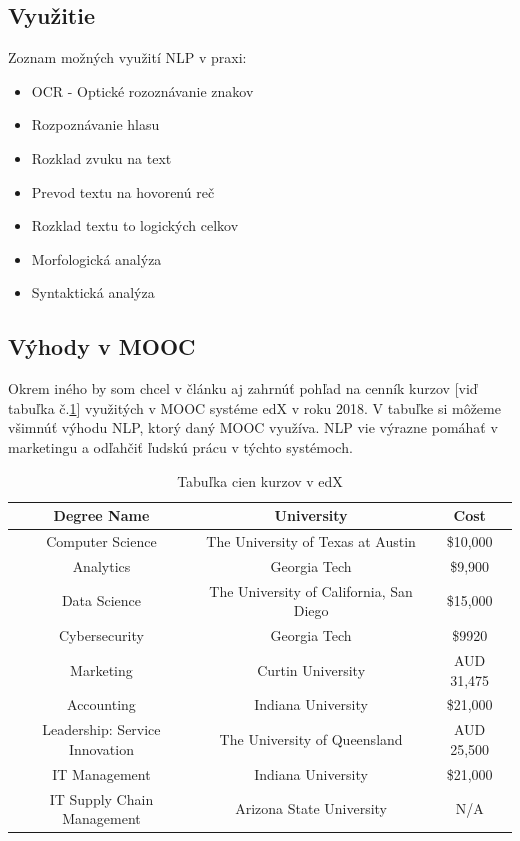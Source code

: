 \documentclass[10pt,slovak,a4paper,twoside]{article}
\begin{document}
\subsection{Využitie}
Zoznam možných využití NLP v praxi\cite{vyuzitieNLP}:
\begin{itemize}
	\item OCR - Optické rozoznávanie znakov
	\item Rozpoznávanie hlasu
	\item Rozklad zvuku na text
	\item Prevod textu na hovorenú reč
	\item Rozklad textu to logických celkov
	\item Morfologická analýza
	\item Syntaktická analýza
\end{itemize}
\subsection{Výhody v MOOC}
Okrem iného by som chcel v článku aj zahrnúť pohľad na cenník kurzov [viď tabuľka č.\ref{table:ceny_edx}] využitých v MOOC systéme edX v roku 2018\cite{cenyEdX}. 
V tabuľke si môžeme všimnúť výhodu NLP, ktorý daný MOOC využíva. NLP vie výrazne pomáhať v marketingu a odľahčiť ľudskú prácu v týchto systémoch.
\begin{table}[H]
	\begin{tabular}{ |c|c|c| } 
		\hline
		Degree Name & University	& Cost	\\
		\hline
		\hline
		Computer Science		& The University of Texas at Austin		& \$10,000 \\ 
		Analytics		& Georgia Tech		& \$9,900 \\ 
		Data Science		& The University of California, San Diego		& \$15,000 \\ 
		Cybersecurity		& Georgia Tech		& \$9920 \\ 
		Marketing & Curtin University		& AUD 31,475 \\ 
		Accounting & Indiana University		& \$21,000 \\ 
		Leadership: Service Innovation		& The University of Queensland		& AUD 25,500 \\ 
		IT Management		& Indiana University		& \$21,000 \\ 
		IT Supply Chain Management		& Arizona State University		& N/A \\ 
		\hline
	\end{tabular}
	\caption{Tabuľka cien kurzov v edX}
	\label{table:ceny_edx}
\end{table}
\end{document}
